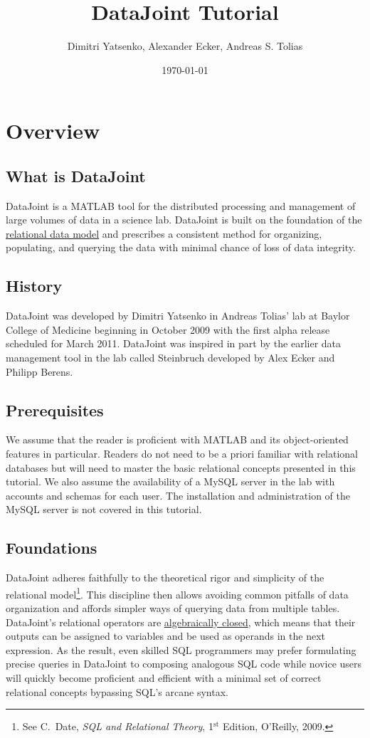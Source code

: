 \documentclass[10pt]{article}
\title{DataJoint Tutorial}
\date{\today} %
\author{Dimitri Yatsenko, Alexander Ecker, Andreas S. Tolias}
\begin{document}
\maketitle
\tableofcontents
\newpage
\newpage\section{Overview}
\subsection{What is DataJoint}
DataJoint is a MATLAB tool for the distributed processing and management of large volumes of data in a science lab.  DataJoint is built on the foundation of the \href{http://en.wikipedia.org/wiki/Relational_model}{relational data model} and prescribes a consistent method for organizing, populating, and querying the data with minimal chance of loss of data integrity.

\subsection{History}
DataJoint was developed by Dimitri Yatsenko in Andreas Tolias' lab at Baylor College of Medicine beginning in October 2009 with the first alpha release scheduled for March 2011. DataJoint was inspired in part by the earlier data management tool in the lab called Steinbruch developed by Alex Ecker and Philipp Berens.

\subsection{Prerequisites}
We assume that the reader is proficient with MATLAB and its object-oriented features in particular.  Readers do not need to be a priori familiar with relational databases but will need to master the basic relational concepts presented in this tutorial. We also assume the availability of a MySQL server in the lab with accounts and schemas for each user. The installation and administration of the MySQL server is not covered in this tutorial.

\subsection{Foundations}
DataJoint adheres faithfully to the theoretical rigor and simplicity of the relational model\footnote{See C.~Date, {\em SQL and Relational Theory}, 1$^{\textrm{st}}$ Edition, O'Reilly, 2009.}. This discipline then allows avoiding common pitfalls of data organization and affords simpler ways of querying data from multiple tables.   DataJoint's relational operators are \href{http://en.wikipedia.org/wiki/Algebraic_closure}{algebraically closed}, which means that their outputs can be assigned to variables and be used as operands in the next expression. As the result, even skilled SQL programmers may prefer formulating precise queries in DataJoint to composing analogous SQL code while novice users will quickly become proficient and efficient with a minimal set of correct relational concepts bypassing SQL's arcane syntax.
\end{document}
